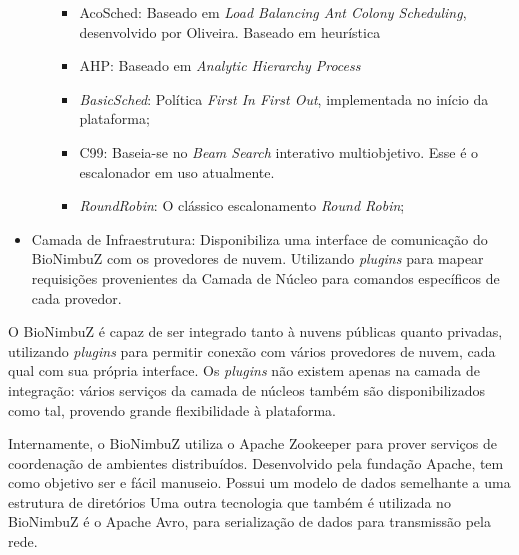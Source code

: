 \begin{itemize}
\begin{itemize}
\begin{itemize}
			\item AcoSched: Baseado em \textit{Load Balancing Ant Colony Scheduling}, desenvolvido por Oliveira. Baseado em heurística\cite{6732620_BioNimbuZ_ACOsched}
			\item AHP: Baseado em \textit{Analytic Hierarchy Process}\cite{6732620_BioNimbuZ_ACOsched}
			\item \textit{BasicSched}: Política \textit{First In First Out}, implementada no início da plataforma;
			\item C99: Baseia-se no \textit{Beam Search} interativo multiobjetivo. \cite{BioNimbuZ_Willian_C99} Esse é o escalonador em uso atualmente.
			\item \textit{RoundRobin}: O clássico escalonamento \textit{Round Robin};
		\end{itemize}
	
	\end{itemize}
	
	\item Camada de Infraestrutura: Disponibiliza uma interface de comunicação do BioNimbuZ com os provedores de nuvem. Utilizando \textit{plugins} para mapear requisições provenientes da Camada de Núcleo para comandos específicos de cada provedor.
\end{itemize}

O BioNimbuZ é capaz de ser integrado tanto à nuvens públicas quanto privadas, utilizando \textit{plugins} para permitir conexão com vários provedores de nuvem, cada qual com sua própria interface. Os \textit{plugins} não existem apenas na camada de integração: vários serviços da camada de núcleos também são disponibilizados como tal, provendo grande flexibilidade à plataforma.

Internamente, o BioNimbuZ utiliza o Apache Zookeeper\cite{Zookeeper} para prover serviços de coordenação de ambientes distribuídos. Desenvolvido pela fundação Apache\cite{Apache}, tem como objetivo ser e fácil manuseio. Possui um modelo de dados semelhante a uma estrutura de diretórios
Uma outra tecnologia que também é utilizada no BioNimbuZ é o Apache Avro\cite{Avro}, para serialização de dados para transmissão pela rede.
